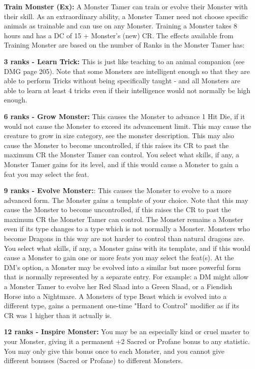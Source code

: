 \textbf{Train Monster (Ex):} A Monster Tamer can train or evolve their Monster with their  skill. As an extraordinary ability,
a Monster Tamer need not choose specific animals as trainable and can use  on any Monster. Training a Monster
takes 8 hours and has a DC of 15 + Monster's (new) CR. The effects available from Training Monster are based on the number of
Ranks in  the Monster Tamer has:

\begin{itemize*}
\item \textbf{3 ranks - Learn Trick:}  This is just like teaching to an animal companion (see DMG page 205). Note that some Monsters are intelligent enough so that they are able to perform Tricks without being specifically taught - and all Monsters are able to learn at least 4 tricks even if their intelligence would not normally be high enough.
\item \textbf{6 ranks - Grow Monster:} This causes the Monster to advance 1 Hit Die, if it would not cause the Monster to exceed its advancement limit. This may cause the creature to grow in size category, see the monster description. This may also cause the Monster to become uncontrolled, if this raises its CR to past the maximum CR the Monster Tamer can control. You select
what skills, if any, a Monster Tamer gains for its level, and if this would cause a Monster to gain a feat you may select the feat.
\item \textbf{9 ranks - Evolve Monster:}: This causes the Monster to evolve to a more advanced form. The Monster gains a template of your choice. Note that this may cause the Monster to become uncontrolled, if this raises the CR to past the maximum CR the Monster Tamer can control. The Monster remains a Monster even if its type changes to a type which is not normally a Monster. Monsters who become Dragons in this way are not harder to control than natural dragons are. You select what skills, if any, a Monster gains with its template, and if this would cause a Monster to gain one or more feats you may select the feat(s). At the DM's option, a Monster may be evolved into a similar but more powerful form that is normally represented by a separate entry. For example: a DM might allow a Monster Tamer to evolve her Red Slaad into a Green Slaad, or a Fiendish Horse into a Nightmare. A Monsters of type Beast which is evolved into a different type, gains a permanent one-time "Hard to Control" modifier as if its CR was 1 higher than it actually is.
\item \textbf{12 ranks - Inspire Monster:} You may be an especially kind or cruel master to your Monster, giving it a permanent +2 Sacred or Profane bonus to any statistic. You may only give this bonus once to each Monster, and you cannot give different bonuses (Sacred or Profane) to different Monsters.
\end{itemize*}

